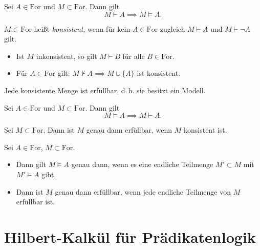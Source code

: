 \documentclass{cheat-sheet}
\newcommand{\For}{\mathrm{For}} %
\begin{document}

\begin{satz}[Korrektheitssatz]
  Sei $A \in \For$ und $M \subset \For$. Dann gilt
  \[ M \vdash A \implies M \models A. \]
\end{satz}

\begin{defn}
  $M \subset \For$ heißt \emph{konsistent}, wenn für kein $A \in \For$ zugleich $M \vdash A$ und $M \vdash \neg A$ gilt.
\end{defn}

\begin{lem}
  \begin{itemize}
    \item Ist $M$ inkonsistent, so gilt $M \vdash B$ für alle $B \in \For$.
    \item Für $A \in \For$ gilt: $M \not\vdash A \implies M \cup \{ A \}$ ist konsistent.
  \end{itemize}
\end{lem}

\begin{lem}
  Jede konsistente Menge ist erfüllbar, d.\,h. sie besitzt ein Modell.
\end{lem}

\begin{satz}[Vollständigkeitssatz]
  Sei $A \in \For$ und $M \subset \For$. Dann gilt
  \[ M \models A \implies M \vdash A. \]
\end{satz}

\begin{prop}
  Sei $M \subset \For$. Dann ist $M$ genau dann erfüllbar, wenn $M$ konsistent ist.
\end{prop}

\begin{samepage}

\begin{satz}
  Sei $A \in \For$, $M \subset \For$.
  \begin{itemize}
    \item Dann gilt $M \models A$ genau dann, wenn es eine endliche Teilmenge $M' \subset M$ mit $M' \models A$ gibt.
    \item Dann ist $M$ genau dann erfüllbar, wenn jede endliche Teilmenge von $M$ erfüllbar ist.
  \end{itemize}
\end{satz}

\section{Hilbert-Kalkül für Prädikatenlogik}
  
\end{samepage}
\end{document}
